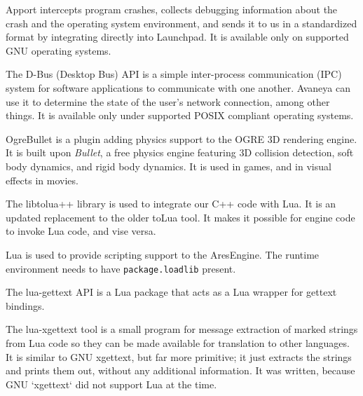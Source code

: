 
\startitemize[3]
\setupwhitespace[big]

Apport intercepts program crashes, collects debugging information about the crash and the operating system environment, and sends it to us in a standardized format by integrating directly into Launchpad. It is available only on supported GNU operating systems.


The D-Bus (Desktop Bus) API is a simple inter-process communication (IPC) system for software applications to communicate with one another. Avaneya can use it to determine the state of the user's network connection, among other things. It is available only under supported POSIX compliant operating systems.
\stopitemize


\startitemize[3]
\setupwhitespace[big]

OgreBullet is a plugin adding physics support to the OGRE 3D rendering engine. It is built upon {\it Bullet}, a free physics engine featuring 3D collision detection, soft body dynamics, and rigid body dynamics. It is used in games, and in visual effects in movies.
\stopitemize



\startitemize[3]
\setupwhitespace[big]

The libtolua++ library is used to integrate our C++ code with Lua. It is an updated replacement to the older toLua tool. It makes it possible for engine code to invoke Lua code, and vise versa.


Lua is used to provide scripting support to the AresEngine. The runtime environment needs to have {\tt package.loadlib} present.


The lua-gettext API is a Lua package that acts as a Lua wrapper for gettext bindings.


The lua-xgettext tool is a small program for message extraction of marked strings from Lua code so they can be made available for translation to other languages. It is similar to GNU xgettext, but far more primitive; it just extracts the strings and prints them out, without any additional information. It was written, because GNU `xgettext` did not support Lua at the time.
\stopitemize

\StopChapter

